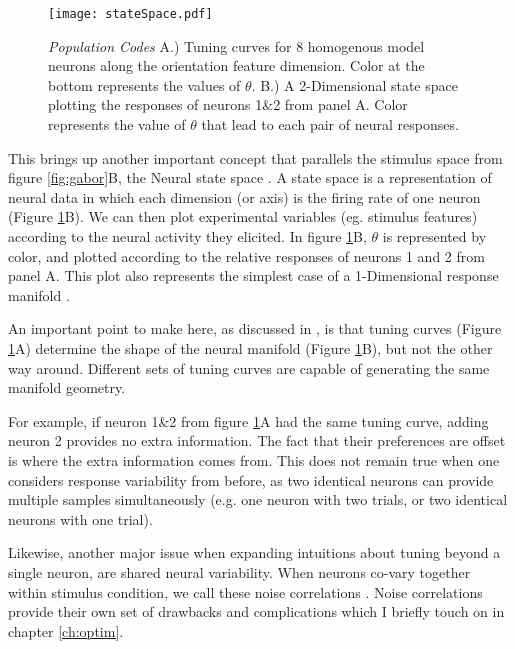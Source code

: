 \begin{figure}[h]
	\centerline{\texttt{[image: stateSpace.pdf]}}
	\caption{\textit{Population Codes} A.) Tuning curves for 8 homogenous model neurons along the orientation feature dimension. Color at the bottom represents the values of $\theta$. B.) A 2-Dimensional state space plotting the responses of neurons 1\&2 from panel A. Color represents the value of $\theta$ that lead to each pair of neural responses.  }
	\label{fig:stateSpace}
\end{figure}

This brings up another important concept that parallels the stimulus space from figure \ref{fig:gabor}B, the Neural state space \parencite{Paninski2010,Cross2021a}. A state space is a representation of neural data in which each dimension (or axis) is the firing rate of one neuron (Figure \ref{fig:stateSpace}B). We can then plot experimental variables (eg. stimulus features) according to the neural activity they elicited. In figure \ref{fig:stateSpace}B, $\theta$ is represented by color, and plotted according to the relative responses of neurons 1 and 2 from panel A. This plot also represents the simplest case of a 1-Dimensional response manifold \parencite{Kriegeskorte2021, Chung2018}. 

An important point to make here, as discussed in \textcite{Kriegeskorte2021}, is that tuning curves (Figure \ref{fig:stateSpace}A) determine the shape of the neural manifold (Figure \ref{fig:stateSpace}B), but not the other way around. Different sets of tuning curves are capable of generating the same manifold geometry. 


For example, if neuron 1\&2 from figure \ref{fig:stateSpace}A had the same tuning curve, adding neuron 2 provides no extra information. The fact that their preferences are offset is where the extra information comes from. This does not remain true when one considers response variability from before, as two identical neurons can provide multiple samples simultaneously (e.g. one neuron with two trials, or two identical neurons with one trial). 

Likewise, another major issue when expanding intuitions about tuning beyond a single neuron, are shared neural variability. When neurons co-vary together within stimulus condition, we call these noise correlations \parencite{Cohen2009, Ruff2016, Snyder2014, Moreno-Bote2014a}. Noise correlations provide their own set of drawbacks and complications which I briefly touch on in chapter \ref{ch:optim}.


